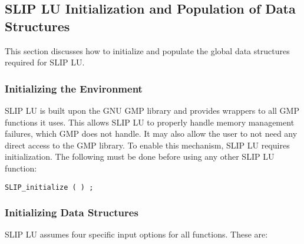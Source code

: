 \documentclass[12pt]{article}
\theoremstyle{definition}
\begin{document}
\cprotect\subsection{SLIP LU Initialization and Population of Data Structures}
\label{s:Using:init}

This section discusses how to initialize and populate the global data
structures required for SLIP LU.

\subsubsection{Initializing the Environment}

SLIP LU is built upon the GNU GMP library \cite{granlund2015gnu} and provides
wrappers to all GMP functions it uses.  This allows SLIP LU to properly handle
memory management failures, which GMP does not handle.  It may also allow the
user to not need any direct access to the GMP library.  To enable this
mechanism, SLIP LU requires initialization.  The following must be done before
using any other SLIP LU function:

\verb|SLIP_initialize ( ) ;|

\subsubsection{Initializing Data Structures}
\label{ss:init}

SLIP LU assumes four specific input options for all functions. These are:
\end{document}
